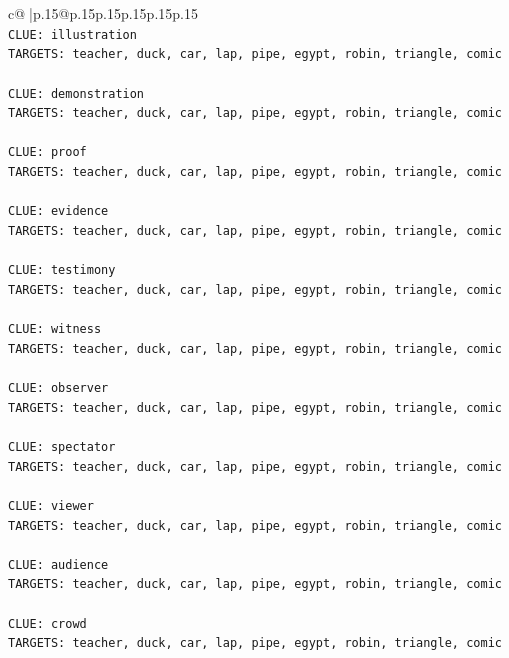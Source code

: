 \documentclass{article}
\begin{document}
{\begin{supertabular}{c@{$\;$}|p{.15\linewidth}@{}p{.15\linewidth}p{.15\linewidth}p{.15\linewidth}p{.15\linewidth}p{.15\linewidth}}
{{{\\ 
\texttt{CLUE: illustration} \\
\texttt{TARGETS: teacher, duck, car, lap, pipe, egypt, robin, triangle, comic} \\
\\ 
\texttt{CLUE: demonstration} \\
\texttt{TARGETS: teacher, duck, car, lap, pipe, egypt, robin, triangle, comic} \\
\\ 
\texttt{CLUE: proof} \\
\texttt{TARGETS: teacher, duck, car, lap, pipe, egypt, robin, triangle, comic} \\
\\ 
\texttt{CLUE: evidence} \\
\texttt{TARGETS: teacher, duck, car, lap, pipe, egypt, robin, triangle, comic} \\
\\ 
\texttt{CLUE: testimony} \\
\texttt{TARGETS: teacher, duck, car, lap, pipe, egypt, robin, triangle, comic} \\
\\ 
\texttt{CLUE: witness} \\
\texttt{TARGETS: teacher, duck, car, lap, pipe, egypt, robin, triangle, comic} \\
\\ 
\texttt{CLUE: observer} \\
\texttt{TARGETS: teacher, duck, car, lap, pipe, egypt, robin, triangle, comic} \\
\\ 
\texttt{CLUE: spectator} \\
\texttt{TARGETS: teacher, duck, car, lap, pipe, egypt, robin, triangle, comic} \\
\\ 
\texttt{CLUE: viewer} \\
\texttt{TARGETS: teacher, duck, car, lap, pipe, egypt, robin, triangle, comic} \\
\\ 
\texttt{CLUE: audience} \\
\texttt{TARGETS: teacher, duck, car, lap, pipe, egypt, robin, triangle, comic} \\
\\ 
\texttt{CLUE: crowd} \\
\texttt{TARGETS: teacher, duck, car, lap, pipe, egypt, robin, triangle, comic} \\
\\ 
}}}
\end{supertabular}}
\end{document}
